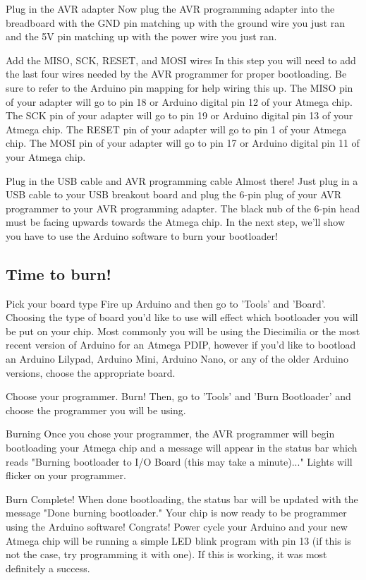 Plug in the AVR adapter
Now plug the AVR programming adapter into the breadboard with the GND pin matching up with the ground wire you just ran and the 5V pin matching up with the power wire you just ran.


Add the MISO, SCK, RESET, and MOSI wires
In this step you will need to add the last four wires needed by the AVR programmer for proper bootloading.
Be sure to refer to the Arduino pin mapping for help wiring this up.
The MISO pin of your adapter will go to pin 18 or Arduino digital pin 12 of your Atmega chip.
The SCK pin of your adapter will go to pin 19 or Arduino digital pin 13 of your Atmega chip.
The RESET pin of your adapter will go to pin 1 of your Atmega chip.
The MOSI pin of your adapter will go to pin 17 or Arduino digital pin 11 of your Atmega chip.


Plug in the USB cable and AVR programming cable
Almost there! Just plug in a USB cable to your USB breakout board and plug the 6-pin plug of your AVR programmer to your AVR programming adapter. The black nub of the 6-pin head must be facing upwards towards the Atmega chip.
In the next step, we'll show you have to use the Arduino software to burn your bootloader!

\subsection{Time to burn!}


Pick your board type
Fire up Arduino and then go to 'Tools' and 'Board'. Choosing the type of board you'd like to use will effect which bootloader you will be put on your chip. Most commonly you will be using the Diecimilia or the most recent version of Arduino for an Atmega PDIP, however if you'd like to bootload an Arduino Lilypad, Arduino Mini, Arduino Nano, or any of the older Arduino versions, choose the appropriate board.


Choose your programmer. Burn!
Then, go to 'Tools' and 'Burn Bootloader' and choose the programmer you will be using.


Burning
Once you chose your programmer, the AVR programmer will begin bootloading your Atmega chip and a message will appear in the status bar which reads "Burning bootloader to I/O Board (this may take a minute)..." Lights will flicker on your programmer.


Burn Complete!
When done bootloading, the status bar will be updated with the message "Done burning bootloader." Your chip is now ready to be programmer using the Arduino software! Congrats! Power cycle your Arduino and your new Atmega chip will be running a simple LED blink program with pin 13 (if this is not the case, try programming it with one). If this is working, it was most definitely a success.

